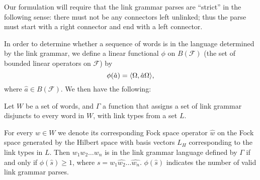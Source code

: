 Our formulation will require that the link grammar parses are ``strict'' in the following sense: there must not be any connectors left unlinked; thus the parse must start with a right connector and end with a left connector.

In order to determine whether a sequence of words is in the language determined by the link grammar, we define a linear functional $\phi$ on $B(\mathcal{F})$ (the set of bounded linear operators on $\mathcal{F}$) by
$$\phi(\hat{a}) = \langle \Omega, \hat{a}\Omega \rangle,$$
where $\hat{a} \in B(\mathcal{F})$.  We then have the following:
\begin{prop}
Let $W$ be a set of words, and $\Gamma$ a function that assigns a set of link grammar disjuncts to every word in $W$, with link types from a set $L$.

For every $w \in W$ we denote its corresponding Fock space operator $\hat{w}$ on the Fock space generated by the Hilbert space with basis vectors $L_H$  corresponding to the link types in $L$. Then $w_1w_2\ldots w_n$ is in the link grammar language defined by $\Gamma$ if and only if $\phi(\hat{s}) \ge 1$, where $s = \hat{w_1}\hat{w_2}\ldots\hat{w_n}$. $\phi(\hat{s})$ indicates the number of valid link grammar parses.
\end{prop}
